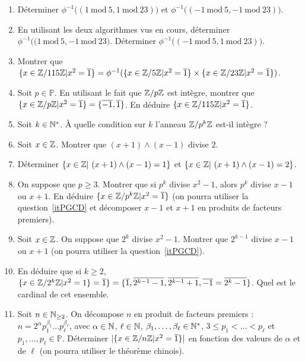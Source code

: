 \documentclass[11pt,a4paper]{article}
\begin{document}
\begin{enumerate}
\item\label{phiMoinsUn_Un} Déterminer $\phi^{-1}\big((1\mathrm{\ mod\ }5,1\mathrm{\ mod\ }23)\big)$ et $\phi^{-1}\big((-1\mathrm{\ mod\ }5,-1\mathrm{\ mod\ }23)\big)$.

\item\label{phiMoinsUn_Un_moinUn} En utilisant les deux algorithmes vus en cours, déterminer $\phi^{-1}\big((1\mathrm{\ mod\ }5,-1\mathrm{\ mod\ }23\big)$. Déterminer $\phi^{-1}\big((-1\mathrm{\ mod\ }5,1\mathrm{\ mod\ }23)\big)$.

\item\label{Racine_carrées_phiMoinsUn} Montrer que $\{x\in \mathbb{Z}/115\mathbb{Z}| x^2=\overline{1}\}=\phi^{-1}(\{x\in \mathbb{Z}/5\mathbb{Z}| x^2=\overline{1}\}\times  \{x\in \mathbb{Z}/23\mathbb{Z}|x^2=\overline{1}\})$. 

\item\label{Carré_Fp} Soit $p\in \mathbb{P}$. En utilisant le fait que $\mathbb{Z}/p\mathbb{Z}$ est intègre, montrer que $\{x\in \mathbb{Z}/p\mathbb{Z}|x^2=\overline{1}\}=\{\overline{-1},\overline{1}\}$. En déduire $\{x\in \mathbb{Z}/115\mathbb{Z}|x^2=\overline{1}\}$. 


\item\label{Question_integrité} Soit  $k\in \mathbb{N}^*$. À quelle condition sur $k$ l'anneau $\mathbb{Z}/p^k\mathbb{Z}$ est-il intègre ?

\item\label{itPGCD} Soit $x\in \mathbb{Z}$. Montrer que $(x+1)\wedge (x-1) $ divise $2$.

\item\label{Determination_Pgcd}  Déterminer $\{x\in \mathbb{Z}|\ (x+1)\wedge (x-1)=1\}$ et $\{x\in \mathbb{Z}|\ (x+1)\wedge (x-1)=2\}$.

\item\label{Racine_carrée_pk} On suppose que  $p \geq 3$. Montrer que si $p^k$ divise $x^2-1$, alors $p^k$ divise $x-1$ ou $x+1$. En déduire $\{x\in  \mathbb{Z}/p^k\mathbb{Z}|x^2=\overline{1}\}$ (on pourra utiliser la question~\ref{itPGCD} et décomposer $x-1$ et $x+1$ en produits de facteurs premiers).

\item\label{Division_2k} Soit $x\in \mathbb{Z}$. On suppose que $2^k$ divise $x^2-1$. Montrer que $2^{k-1}$ divise $x-1$ ou $x+1$ (on pourra utiliser la question~\ref{itPGCD}).

 \item\label{Racine_Carrée_2k} En déduire que si $k\geq 2$, $\{x\in \mathbb{Z}/2^k\mathbb{Z}| x^2=1\}=\overline{1}\}=\{\overline{1}, \overline{2^{k-1}-1},  \overline{2^{k-1}+1}, \overline{-1}=\overline{2^k-1}\}$. Quel est le cardinal de cet ensemble.
 
 \item\label{Racine_carrée_cas_général} Soit $n\in \mathbb{N}_{\geq 2}$. On décompose $n$ en produit de facteurs premiers : $n=2^\alpha p_1^{\beta_1}\ldots p_\ell^{\beta_\ell}$, avec $\alpha\in \mathbb{N}$, $\ell\in \mathbb{N}$, $\beta_1,\ldots,\beta_\ell\in \mathbb{N}^*$,  $3\leq  p_1<\ldots<p_\ell$ et $p_1,\ldots,p_\ell\in \mathbb{P}$. Déterminer $|\{x\in \mathbb{Z}/n\mathbb{Z}|x^2=\overline{1}\}|$  en fonction des valeurs de $\alpha$ et de $\ell$ (on pourra utiliser le théorème chinois). 

\end{enumerate}
\end{document}
